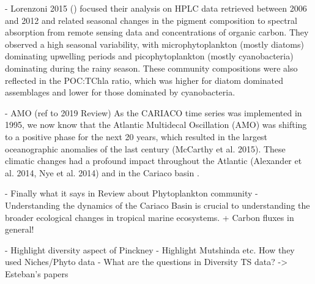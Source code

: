 \documentclass[draft]{agujournal2019}
\begin{document}
    - Lorenzoni 2015 ()
     focused their analysis on HPLC data retrieved between 2006 and 2012 and related seasonal changes in the pigment composition to spectral absorption from remote sensing data and concentrations of organic carbon. They observed a high seasonal variability, with microphytoplankton (mostly diatoms) dominating upwelling periods and picophytoplankton (mostly cyanobacteria) dominating during the rainy season. These community compositions were also reflected in the POC:TChla ratio, which was higher for diatom dominated assemblages and lower for those dominated by cyanobacteria. 
    
    - AMO (ref to 2019 Review)
    As the CARIACO time series was implemented in 1995, we now know that the Atlantic Multidecal Oscillation (AMO) was shifting to a positive phase for the next 20 years, which resulted in the largest oceanographic anomalies of the last century (McCarthy et al. 2015). These climatic changes had a profound impact throughout the Atlantic (Alexander et al. 2014, Nye et al. 2014) and in the Cariaco basin \cite{taylor_ecosystem_2012,pinckney_phytoplankton_2015}.

    
    - Finally what it says in Review about Phytoplankton community
    - Understanding the dynamics of the Cariaco Basin is crucial to understanding the broader ecological changes in tropical marine ecosystems. + Carbon fluxes in general!

    - Highlight diversity aspect of Pinckney
    - Highlight Mutshinda etc. How they used Niches/Phyto data
    - What are the questions in Diversity TS data? -> Esteban's papers
   



    
    
\end{document}
